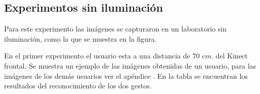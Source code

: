 \subsection{Experimentos sin iluminación}
Para este experimento las imágenes se capturaron en un laboratorio sin iluminación, como la que se muestra en la figura.

En el primer experimento el usuario esta a una distancia de $70$ $cm.$ del Kinect frontal. Se muestra un ejemplo de las imágenes obtenidas de un usuario, para las imágenes de los demás usuarios ver el apéndice . En la tabla se encuentran los resultados del reconocimiento de los dos gestos.  

\begin{figure}[h!]
\centering
{}

\end{figure}
